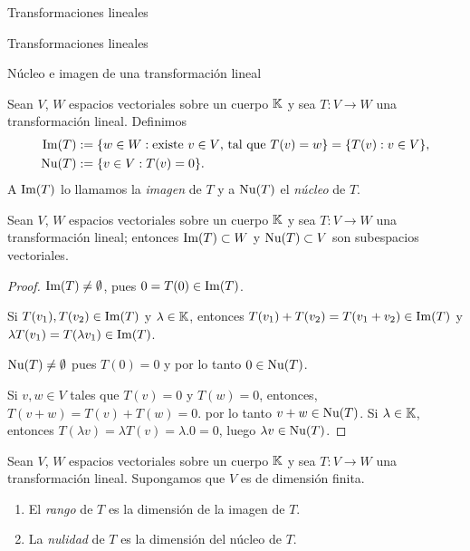 \begin{chapter}{Transformaciones lineales}
\begin{section}{Transformaciones lineales}
        \end{section}
    
    
        \begin{section}{N\'ucleo e imagen de una transformaci\'on lineal}\label{seccion-nucleo-e-imagen-de-una-tl}
        
        \begin{definicion}
            Sean $V$, $W$ espacios vectoriales sobre un cuerpo $\mathbb K$ y sea $T:V \to W$ una transformación lineal.  Definimos
            \begin{align*}
                \operatorname{Im}(T) &:= \{w \in W:\text{existe $v \in V$, tal que } T(v)=w\} = \{T(v): v \in V \}, \\
                \operatorname{Nu}(T) &:= \{v \in V: T(v)=0 \}. 
            \end{align*}
            A $\operatorname{Im}(T)$ lo llamamos la \textit{imagen} de $T$ y a $ \operatorname{Nu}(T)$ el \textit{núcleo} de $T$. 
        \end{definicion}
        
        \begin{teorema}
            Sean $V$, $W$ espacios vectoriales sobre un cuerpo $\mathbb K$ y sea $T:V \to W$ una transformación lineal; entonces $\operatorname{Im}(T) \subset W$ y $\operatorname{Nu}(T) \subset V$ son subespacios vectoriales.
        \end{teorema}
        \begin{proof}
            $\operatorname{Im}(T) \ne \emptyset$, pues $0 = T(0) \in \operatorname{Im}(T)$. 
            
            Si $T(v_1),T(v_2) \in \operatorname{Im}(T)$ y $\lambda \in \mathbb K$,  entonces $T(v_1) + T(v_2) = T(v_1+v_2) \in \operatorname{Im}(T)$ y $\lambda T(v_1) = T(\lambda v_1) \in \operatorname{Im}(T)$.
            
            
            $\operatorname{Nu}(T) \ne \emptyset$ pues $T(0) =0$ y por lo tanto $0 \in \operatorname{Nu}(T)$.
            
            Si $v,w \in V$ tales que $T(v) =0$ y $T(w)=0$,  entonces, $T(v+w)= T(v)+T(w) =0$. por lo tanto $v+w \in \operatorname{Nu}(T)$. Si  $\lambda \in \mathbb K$,  entonces $T(\lambda v) = \lambda T(v) = \lambda.0 =0$, luego  $\lambda v \in \operatorname{Nu}(T)$.
        \end{proof}

    
        \begin{definicion}
            Sean $V$, $W$ espacios vectoriales sobre un cuerpo $\mathbb K$ y sea $T:V \to W$ una transformación lineal. Supongamos que $V$ es de dimensión finita.
            \begin{enumerate}
\item El \textit{rango} de $T$ es la dimensión de la imagen de $T$.
\item La \textit{nulidad} de $T$ es la dimensión del núcleo  de $T$.
            \end{enumerate}
            

\end{definicion}
\end{section}
\end{chapter}
